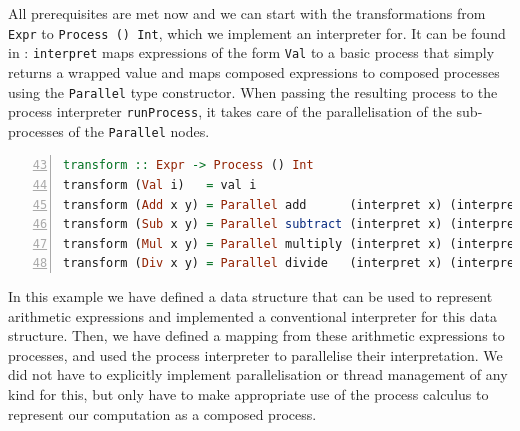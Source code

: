 All prerequisites are met now and we can start with the transformations from \texttt{Expr} to \texttt{Process () Int}, which we implement an interpreter for. It can be found in : \texttt{interpret} maps expressions of the form \texttt{Val} to a basic process that simply returns a wrapped value and maps composed expressions to composed processes using the \texttt{Parallel} type constructor. When passing the resulting process to the process interpreter \texttt{runProcess}, it takes care of the parallelisation of the sub-processes of the \texttt{Parallel} nodes.
\begin{lstlisting}[language=Haskell, caption=Transformation from \texttt{Expr} to processes., label=lst:arith_transformation, numbers=left, frame=bt, firstnumber=43]
transform :: Expr -> Process () Int
transform (Val i)   = val i
transform (Add x y) = Parallel add      (interpret x) (interpret y)
transform (Sub x y) = Parallel subtract (interpret x) (interpret y)
transform (Mul x y) = Parallel multiply (interpret x) (interpret y)
transform (Div x y) = Parallel divide   (interpret x) (interpret y)
\end{lstlisting}

In this example we have defined a data structure that can be used to represent arithmetic expressions and implemented a conventional interpreter for this data structure. Then, we have defined a mapping from these arithmetic expressions to processes, and used the process interpreter to parallelise their interpretation. We did not have to explicitly implement parallelisation or thread management of any kind for this, but only have to make appropriate use of the process calculus to represent our computation as a composed process.
